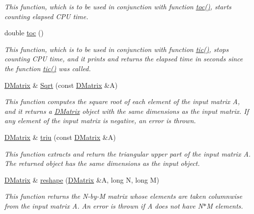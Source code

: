 \begin{DoxyCompactItemize}
\begin{DoxyCompactList}\small\item\em This function, which is to be used in conjunction with function \hyperlink{classDMatrix_a38664cf3d259198ae1e644736aa5e70e}{toc()}, starts counting elapsed CPU time. \item\end{DoxyCompactList}\item 
double \hyperlink{classDMatrix_a38664cf3d259198ae1e644736aa5e70e}{toc} ()
\begin{DoxyCompactList}\small\item\em This function, which is to be used in conjunction with function \hyperlink{classDMatrix_ace51fd7d8435f88c8b2b3bcf64367673}{tic()}, stops counting CPU time, and it prints and returns the elapsed time in seconds since the function \hyperlink{classDMatrix_ace51fd7d8435f88c8b2b3bcf64367673}{tic()} was called. \item\end{DoxyCompactList}\item 
\hyperlink{classDMatrix}{DMatrix} \& \hyperlink{classDMatrix_ae2a60a1294685079c39ea189bacdb4d2}{Sqrt} (const \hyperlink{classDMatrix}{DMatrix} \&A)
\begin{DoxyCompactList}\small\item\em This function computes the square root of each element of the input matrix A, and it returns a \hyperlink{classDMatrix}{DMatrix} object with the same dimensions as the input matrix. If any element of the input matrix is negative, an error is thrown. \item\end{DoxyCompactList}\item 
\hyperlink{classDMatrix}{DMatrix} \& \hyperlink{classDMatrix_a8483633c05422fa0beb4fcad7276152f}{triu} (const \hyperlink{classDMatrix}{DMatrix} \&A)
\begin{DoxyCompactList}\small\item\em This function extracts and return the triangular upper part of the input matrix A. The returned object has the same dimensions as the input object. \item\end{DoxyCompactList}\item 
\hyperlink{classDMatrix}{DMatrix} \& \hyperlink{classDMatrix_ae626fae47c554940c8384933c6ca1e9f}{reshape} (\hyperlink{classDMatrix}{DMatrix} \&A, long N, long M)
\begin{DoxyCompactList}\small\item\em This function returns the N-\/by-\/M matrix whose elements are taken columnwise from the input matrix A. An error is thrown if A does not have N$\ast$M elements. \item\end{DoxyCompactList}\item 

\end{DoxyCompactItemize}
